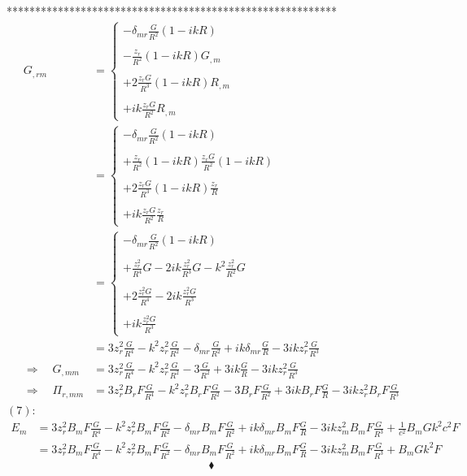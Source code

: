\newpage
**********************************************************
\begin{align}
G_{,rm} &= \left\{\begin{array}{l}-\delta_{mr}\frac{G}{R^2}\left(1-ikR\right)\\\\
-\frac{z_r}{R^2}\left(1-ikR\right)G_{,m}\\\\
+2\frac{z_rG}{R^3}\left(1-ikR\right)R_{,m}\\\\
+ik\frac{z_rG}{R^2}R_{,m}
\end{array}\right.\\
&= \left\{\begin{array}{l}-\delta_{mr}\frac{G}{R^2}\left(1-ikR\right)\\\\
+\frac{z_r}{R^2}\left(1-ikR\right)\frac{z_rG}{R^2}\left(1-ikR\right)\\\\
+2\frac{z_rG}{R^3}\left(1-ikR\right)\frac{z_r}{R}\\\\
+ik\frac{z_rG}{R^2}\frac{z_r}{R}
\end{array}\right.\\
&= \left\{\begin{array}{l}-\delta_{mr}\frac{G}{R^2}\left(1-ikR\right)\\\\
+\frac{z_r^2}{R^4}G-2ik\frac{z_r^2}{R^3}G-k^2\frac{z_r^2}{R^2}G\\\\
+2\frac{z_r^2G}{R^4}-2ik\frac{z_r^2G}{R^3}\\\\
+ik\frac{z_r^2G}{R^3}
\end{array}\right.\\
&= 3z_r^2\frac{G}{R^4}-k^2z_r^2\frac{G}{R^2}-\delta_{mr}\frac{G}{R^2}+ik\delta_{mr}\frac{G}{R}-3ikz_r^2\frac{G}{R^3}\\
\Rightarrow\quad G_{,mm}&= 3z_r^2\frac{G}{R^4}-k^2z_r^2\frac{G}{R^2}-3\frac{G}{R^2}+3ik\frac{G}{R}-3ikz_r^2\frac{G}{R^3}\\
\Rightarrow\quad \Pi_{r,mm}&= 3z_r^2B_rF\frac{G}{R^4}-k^2z_r^2B_rF\frac{G}{R^2}-3B_rF\frac{G}{R^2}+3ikB_rF\frac{G}{R}-3ikz_r^2B_rF\frac{G}{R^3}
\end{align}
$(7)$:
\begin{align}
E_m&= 3z_r^2B_mF\frac{G}{R^4}-k^2z_r^2B_mF\frac{G}{R^2}-\delta_{mr}B_mF\frac{G}{R^2}+ik\delta_{mr}B_mF\frac{G}{R}-3ikz_m^2B_mF\frac{G}{R^3} +\frac{1}{c^2}B_mGk^2c^2F\\
&= 3z_r^2B_mF\frac{G}{R^4}-k^2z_r^2B_mF\frac{G}{R^2}-\delta_{mr}B_mF\frac{G}{R^2}+ik\delta_{mr}B_mF\frac{G}{R}-3ikz_m^2B_mF\frac{G}{R^3} +B_mGk^2F
\end{align}
$$\blacklozenge$$
\newpage




